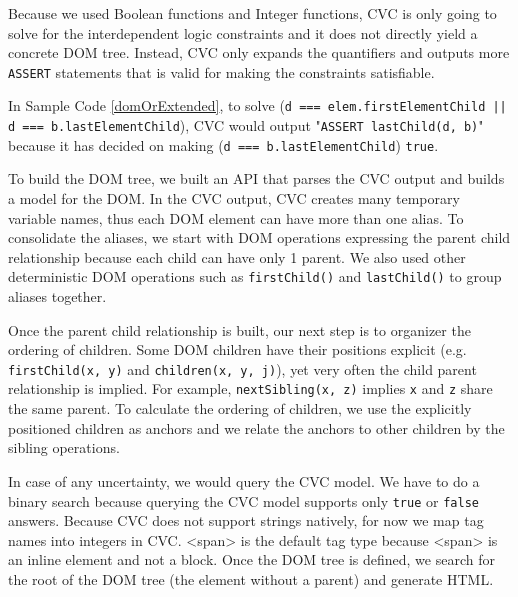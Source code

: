 Because we used Boolean functions and Integer functions, CVC is only going to solve for the interdependent logic constraints and it does not directly yield a concrete DOM tree.  
Instead, CVC only expands the quantifiers and outputs more {\tt ASSERT} statements that is valid for making the constraints satisfiable.  

In Sample Code \ref{domOrExtended}, to solve ({\tt d === elem.firstElementChild || d === b.lastElementChild}), CVC would output "{\tt ASSERT lastChild(d, b)}" because it has decided on making ({\tt d === b.lastElementChild}) {\tt true}.

To build the DOM tree, we built an API that parses the CVC output and builds a model for the DOM.  
In the CVC output, CVC creates many temporary variable names, thus each DOM element can have more than one alias.  
To consolidate the aliases, we start with DOM operations expressing the parent child relationship because each child can have only 1 parent.  We also used other deterministic DOM operations such as {\tt firstChild()} and {\tt lastChild()} to group aliases together.  

Once the parent child relationship is built, our next step is to organizer the ordering of children.  
Some DOM children have their positions explicit (e.g. {\tt firstChild(x, y)} and {\tt children(x, y, j)}), yet very often the child parent relationship is implied.  For example, {\tt nextSibling(x, z)} implies {\tt x} and {\tt z} share the same parent.  
To calculate the ordering of children, we use the explicitly positioned children as anchors and we relate the anchors to other children by the sibling operations.  

In case of any uncertainty, we would query the CVC model.  We have to do a binary search because querying the CVC model supports only {\tt true} or {\tt false} answers.  
Because CVC does not support strings natively, for now we map tag names into integers in CVC.  <span> is the default tag type because <span> is an inline element and not a block.
Once the DOM tree is defined, we search for the root of the DOM tree (the element without a parent) and generate HTML.  


